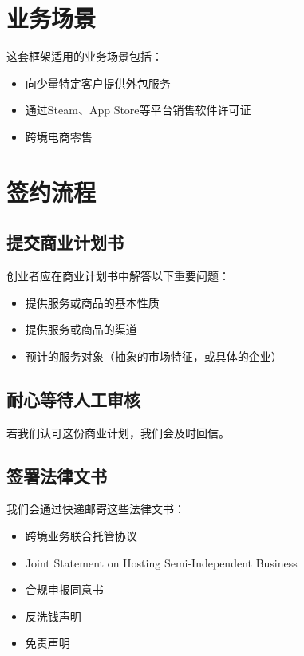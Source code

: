 \documentclass[a4paper,12pt]{report}
\begin{document}
\chapter{业务场景}

这套框架适用的业务场景包括：
\begin{itemize}
	\item 向少量特定客户提供外包服务
	\item 通过Steam、App Store等平台销售软件许可证
	\item 跨境电商零售
\end{itemize}

















\chapter{签约流程}
\section{提交商业计划书}
创业者应在商业计划书中解答以下重要问题：

\begin{itemize}
	\item 提供服务或商品的基本性质
	\item 提供服务或商品的渠道
	\item 预计的服务对象（抽象的市场特征，或具体的企业）
\end{itemize}

\section{耐心等待人工审核}
若我们认可这份商业计划，我们会及时回信。

\section{签署法律文书}
我们会通过快递邮寄这些法律文书：

\begin{itemize}
    \item 跨境业务联合托管协议
    \item Joint Statement on Hosting Semi-Independent Business
    \item 合规申报同意书
    \item 反洗钱声明
    \item 免责声明
\end{itemize}
\end{document}
